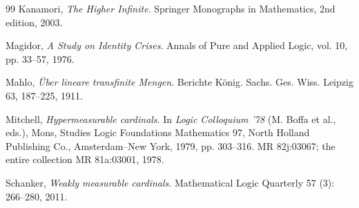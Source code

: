 \documentclass[10pt,leqno]{amsart}
\begin{document}
\begin{thebibliography}{99}
Kanamori, \emph{The Higher Infinite}.
Springer Monographs in Mathematics, 2nd edition, 2003.

Magidor, \emph{A Study on Identity Crises}.
Annals of Pure and Applied Logic, vol. 10, pp. 33--57, 1976.

Mahlo, \emph{Über lineare transfinite Mengen}.
Berichte König. Sachs. Ges. Wiss. Leipzig 63, 187--225, 1911.

Mitchell, \emph{Hypermeasurable cardinals}.
In \emph{Logic Colloquium '78} (M. Boffa et al., eds.),
Mons, Studies Logic Foundations Mathematics 97, North Holland Publishing Co., Amsterdam--New York, 1979,
pp. 303--316. MR 82j:03067; the entire collection MR 81a:03001, 1978.

Schanker, \emph{Weakly measurable cardinals}.
Mathematical Logic Quarterly 57 (3): 266--280, 2011.

\end{thebibliography}
\end{document}

